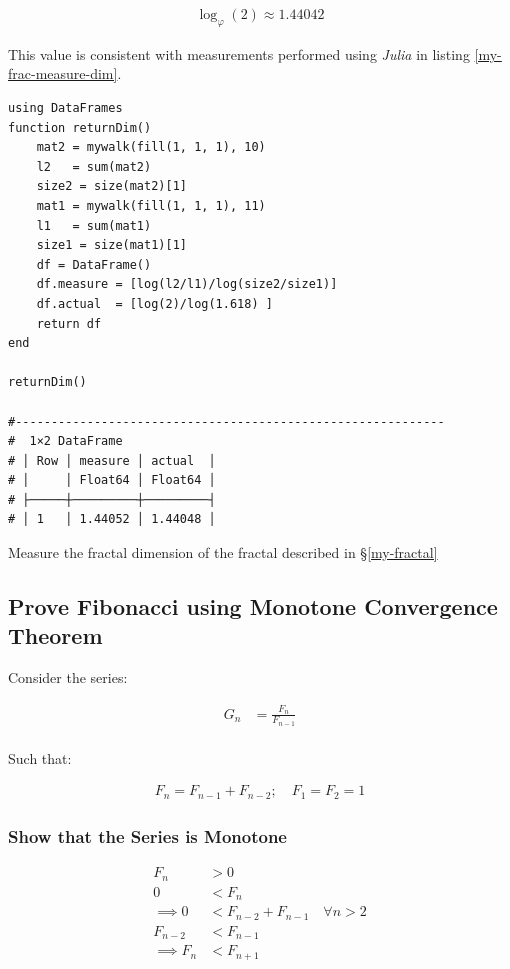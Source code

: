 \documentclass[a4paper,11pt,twoside]{article}
\begin{document}
\begin{align}
\log_{\varphi}\left(2\right) \approx 1.44042
\end{align}

This value is consistent with measurements performed using \emph{Julia} in listing \ref{my-frac-measure-dim}.

\begin{listing}[htbp]
\begin{verbatim}
using DataFrames
function returnDim()
    mat2 = mywalk(fill(1, 1, 1), 10)
    l2   = sum(mat2)
    size2 = size(mat2)[1]
    mat1 = mywalk(fill(1, 1, 1), 11)
    l1   = sum(mat1)
    size1 = size(mat1)[1]
    df = DataFrame()
    df.measure = [log(l2/l1)/log(size2/size1)]
    df.actual  = [log(2)/log(1.618) ]
    return df
end

returnDim()

#------------------------------------------------------------
#  1×2 DataFrame
# │ Row │ measure │ actual  │
# │     │ Float64 │ Float64 │
# ├─────┼─────────┼─────────┤
# │ 1   │ 1.44052 │ 1.44048 │
\end{verbatim}
\caption{\label{my-frac-measure-dim}Measure the fractal dimension of the fractal described in \S \ref{my-fractal}}
\end{listing}



\subsection{Prove Fibonacci using Monotone Convergence Theorem}
\label{fib-golden-ratio-proof}
Consider the series:

$$\begin{aligned}
G_n &= \frac{F_{n} }{F_{n - 1} } \\
\end{aligned}$$

Such that:

$$\begin{aligned}
F_n = F_{n- 1} +  F_{n- 2} ; \quad F_1 = F_2 = 1
\end{aligned}$$


\subsubsection{Show that the Series is Monotone}
\label{sec:org006f1dd}
$$\begin{aligned}
F_{n} &> 0 \\
0 &< F_{n} \\
 \implies   0 &< F_{n - 2} +  F_{n- 1} \quad \forall n > 2 \\
  F_{n- 2} &< F_{n- 1}  \\
   \implies  F_n & < F_{n+1}
\end{aligned}$$
\end{document}
